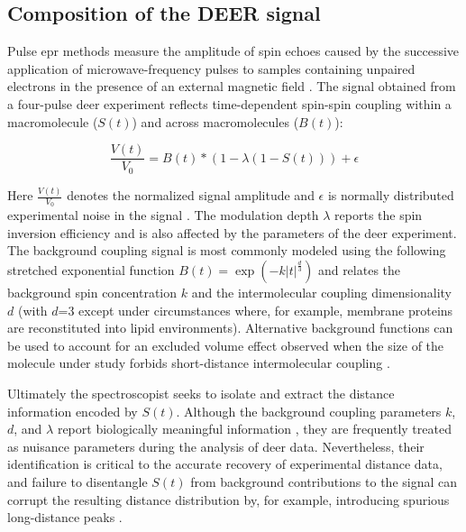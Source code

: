 \subsection{Composition of the DEER signal}

Pulse \gls{epr} methods measure the amplitude of spin echoes caused by the successive application of microwave-frequency pulses to samples containing unpaired electrons in the presence of an external magnetic field \citep*{Milov1998, Milov1983}. The signal obtained from a four-pulse \gls{deer} experiment reflects time-dependent spin-spin coupling within a macromolecule ($S(t)$) and across macromolecules ($B(t)$):

\begin{equation}
    \frac{ V \left( t \right)}{ V_0 } = B \left( t \right) * \left( 1 - \lambda \left( 1 - S \left( t \right) \right) \right) + \epsilon
    \label{eq:deerintro_total}
\end{equation}

Here $\frac{V \left( t \right)}{ V_0 }$ denotes the normalized signal amplitude and $\epsilon$ is normally distributed experimental noise in the signal \citep*{Edwards2016}. The modulation depth $\lambda$ reports the spin inversion efficiency and is also affected by the parameters of the \gls{deer} experiment. The background coupling signal is most commonly modeled using the following stretched exponential function $B\left( t \right) = \exp \left( -k | t|^\frac{d}{3} \right)$ and relates the background spin concentration $k$ and the intermolecular coupling dimensionality $d$ (with $d$=3 except under circumstances where, for example, membrane proteins are reconstituted into lipid environments). Alternative background functions can be used to account for an excluded volume effect observed when the size of the molecule under study forbids short-distance intermolecular coupling \citep*{Kattnig2013}.

Ultimately the spectroscopist seeks to isolate and extract the distance information encoded by $S(t)$. Although the background coupling parameters $k$, $d$, and $\lambda$ report biologically meaningful information \citep*{Jeschke2004}, they are frequently treated as nuisance parameters during the analysis of \gls{deer} data. Nevertheless, their identification is critical to the accurate recovery of experimental distance data, and failure to disentangle $S(t)$ from background contributions to the signal can corrupt the resulting distance distribution by, for example, introducing spurious long-distance peaks \citep*{Jeschke2006}.

